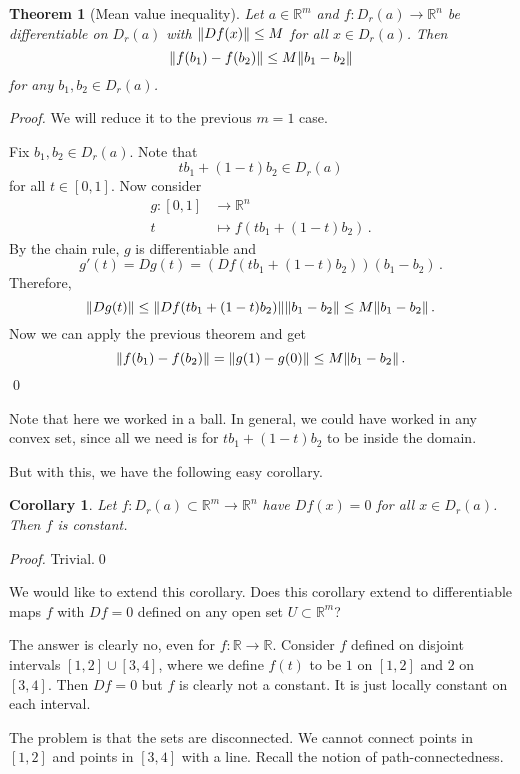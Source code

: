 \documentclass{article}
\theoremstyle{plain}\theoremheaderfont{\normalfont\itshape}\theorembodyfont{\rmfamily}\theoremseparator{.}\newtheorem*{rem}{Remark}\newtheorem*{ex}{Example}\newtheorem*{proof}{Proof}\newtheorem*{altp}{Alternative proof}
\theoremstyle{plain}\theoremheaderfont{\normalfont\bfseries}\theorembodyfont{\rmfamily}\theoremseparator{.}\newtheorem{thm}{Theorem}[section]\newtheorem{lem}[thm]{Lemma}\newtheorem{prop}[thm]{Proposition}\newtheorem*{cor}{Corollary}\newtheorem{defn}[thm]{Definition}\newtheorem{clm}[thm]{Claim}\newtheorem{clminproof}{Claim}
\theoremstyle{break}\theoremheaderfont{\normalfont\itshape}\theorembodyfont{\rmfamily}\theoremseparator{.\medskip}\newtheorem*{proofskip}{Proof}\newtheorem*{exs}{Examples}\newtheorem*{rems}{Remarks}
\theoremstyle{break}\theoremheaderfont{\normalfont\bfseries}\theorembodyfont{\rmfamily}\theoremseparator{.\medskip}\newtheorem{lemskip}[thm]{Lemma}\newtheorem{defnskip}[thm]{Definition}\newtheorem{propskip}[thm]{Proposition}\newtheorem{thmskip}[thm]{Theorem}
\newcommand{\qed}{\hfill\ensuremath{\Box}}
\begin{document}
    \begin{thm}[Mean value inequality]
        Let \(a\in\mathbb{R}^m\) and \(f:D_r(a)\to\mathbb{R}^n\) be differentiable on \(D_r(a)\) with \(\norm{Df(x)}\le M\) for all \(x\in D_r(a)\). Then
        \[\norm{f(b_1)-f(b_2)}\le M\norm{b_1-b_2}\]
        for any \(b_1,b_2\in D_r(a)\).
    \end{thm}
    \begin{proof}
        We will reduce it to the previous \(m=1\) case.

        Fix \(b_1,b_2\in D_r(a)\). Note that
        \[tb_1+(1-t)b_2\in D_r(a)\]
        for all \(t\in[0,1]\). Now consider
        \begin{align*}
            g:[0,1]&\to\mathbb{R}^n\\
            t&\mapsto f(tb_1+(1-t)b_2)\,.
        \end{align*}
        By the chain rule, \(g\) is differentiable and
        \[g'(t)=Dg(t)=(Df(tb_1+(1-t)b_2))(b_1-b_2)\,.\]
        Therefore,
        \[\norm{Dg(t)}\le\norm{Df(tb_1+(1-t)b_2)}\norm{b_1-b_2}\le M\norm{b_1-b_2}\,.\]
        Now we can apply the previous theorem and get
        \[\norm{f(b_1)-f(b_2)}=\norm{g(1)-g(0)}\le M\norm{b_1-b_2}\,.\]\qed
    \end{proof}

    Note that here we worked in a ball. In general, we could have worked in any convex set, since all we need is for \(tb_1+(1-t)b_2\) to be inside the domain.
    
    But with this, we have the following easy corollary.
    \begin{cor}
        Let \(f:D_r(a)\subset\mathbb{R}^m\to\mathbb{R}^n\) have \(Df(x)=0\) for all \(x\in D_r(a)\). Then \(f\) is constant.
    \end{cor}
    \begin{proof}
        Trivial.\qed
    \end{proof}
    We would like to extend this corollary. Does this corollary extend to differentiable maps \(f\) with \(Df=0\) defined on any open set \(U\subset\mathbb{R}^m\)?

    The answer is clearly no, even for \(f:\mathbb{R}\to\mathbb{R}\). Consider \(f\) defined on disjoint intervals \([1,2]\cup[3,4]\), where we define \(f(t)\) to be \(1\) on \([1,2]\) and \(2\) on \([3,4]\). Then \(Df=0\) but \(f\) is clearly not a constant. It is just locally constant on each interval.

    The problem is that the sets are disconnected. We cannot connect points in \([1,2]\) and points in \([3,4]\) with a line. Recall the notion of path-connectedness.
\end{document}
